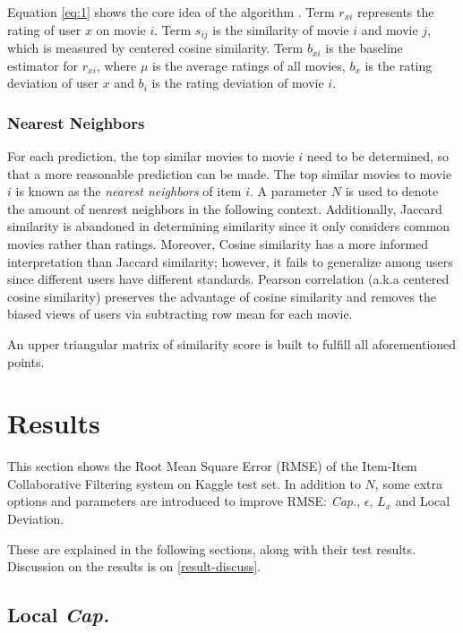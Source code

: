 \documentclass{ece}
\begin{document}
Equation \eqref{eq:1} shows the core idea of the algorithm \cite{mmds_org}.
Term $r_{xi}$ represents the rating of user $x$ on movie $i$.
Term $s_{ij}$ is the similarity of movie $i$ and movie $j$, which is measured by centered cosine similarity.
Term $b_{xi}$ is the baseline estimator for $r_{xi}$, where $\mu$ is the average ratings of all movies, $b_x$ is the rating deviation of user $x$ and $b_i$ is the rating deviation of movie $i$.

\subsubsection{Nearest Neighbors}
\label{knn}
For each prediction, the top similar movies to movie $i$ need to be determined, so that a more reasonable prediction can be made.
The top similar movies to movie $i$ is known as the \textit{nearest neighbors} of item $i$.
A parameter $N$ is used to denote the amount of nearest neighbors in the following context.
Additionally, Jaccard similarity is abandoned in determining similarity since it only considers common movies rather than ratings.
Moreover, Cosine similarity has a more informed interpretation than Jaccard similarity; however, it fails to generalize among users since different users have different standards.
Pearson correlation (a.k.a centered cosine similarity) preserves the advantage of cosine similarity and removes the biased views of users via subtracting row mean for each movie.

An upper triangular matrix of similarity score is built to fulfill all aforementioned points.

\section{Results}

This section shows the Root Mean Square Error (RMSE) of the Item-Item Collaborative Filtering system on Kaggle test set.
In addition to $N$, some extra options and parameters are introduced to improve RMSE:
\textit{Cap.},
$\epsilon$,
$L_x$ and Local Deviation.

These are explained in the following sections, along with their test results. Discussion on the results is on \ref{result-discuss}.

\subsection{Local \textit{Cap.}}
\end{document}
